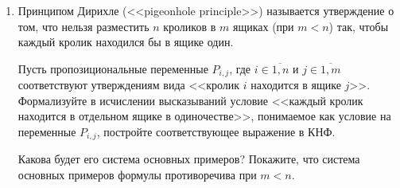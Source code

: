 \documentclass[10pt,a4paper,oneside]{article}
\begin{document}
\begin{enumerate}
\item Принципом Дирихле (<<pigeonhole principle>>) называется утверждение о том, что нельзя разместить $n$ кроликов в $m$ ящиках (при $m < n$) так, чтобы
каждый кролик находился бы в ящике один. 

Пусть пропозициональные переменные $P_{i,j}$, где $i \in \overline{1,n}$ и $j \in \overline{1,m}$ 
соответствуют утверждениям вида <<кролик $i$ находится в ящике $j$>>.
Формализуйте в исчислении высказываний условие 
<<каждый кролик находится в отдельном ящике в одиночестве>>,
понимаемое как условие на переменные $P_{i,j}$,
постройте соответствующее выражение в КНФ. 

Какова будет его система основных примеров?
Покажите, что система основных примеров формулы противоречива при $m < n$.
\end{enumerate}
\end{document}
